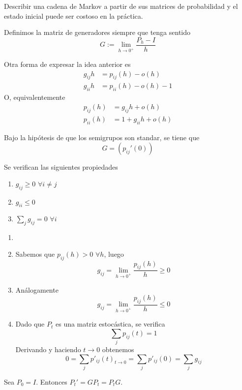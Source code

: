 \documentclass[PREyA.tex]{subfiles}
\begin{document}
\begin{nota}
Describir una cadena de Markov a partir de sus matrices de probabilidad y el estado inicial puede ser costoso en la práctica.
\end{nota}
\begin{defi}
Definimos la matriz de generadores siempre que tenga sentido
$$
G:= \lim_{h\to 0^+} \frac{P_h -I }{h} 
$$
\end{defi}
\begin{nota}
Otra forma de expresar la idea anterior es
\begin{align*}
g_{ij}h &= p_{ij}(h) - o(h)\\
g_{ii}h &= p_{ii}(h) - o(h) -1
\end{align*}
O, equivalentemente
\begin{align*}
p_{ij}(h) &= g_{ij}h + o(h)\\
p_{ii}(h) &= 1+ g_{ii}h + o(h) 
\end{align*}
\end{nota}
\begin{prop}
Bajo la hipótesis de que los semigrupos son standar, se tiene que
$$
G= (p_{ij}'(0))
$$
\end{prop}
\begin{prop}
Se verifican las siguientes propiedades
\begin{enumerate}
\item $g_{ij}\geq 0$ $\forall i \neq j$
\item $g_{ii} \leq 0$ 
\item $\sum_{j} g_{ij} = 0$ $\forall i$
\end{enumerate}
\end{prop}
\begin{dem}
\begin{enumerate}
\item[]
\item Sabemos que $p_{ij}(h)>0$ $\forall h$, luego
$$
g_{ij}=\lim_{h\to0^+}\frac{p_{ij}(h)}{h}\geq 0
$$
\item Análogamente
$$
g_{ij}=\lim_{h\to0^+}\frac{p_{ij}(h)}{h}\leq 0
$$
\item Dado que $P_t$ es una matriz estocástica, se verifica
$$
\sum_{j}p_{ij}(t)=1
$$
Derivando y haciendo $t\to 0$ obtenemos
$$
0 = \sum_j p'_{ij}(t)_{t\to 0} = \sum_j p'_{ij}(0) = \sum_j g_{ij}
$$
\end{enumerate}
\end{dem}
\begin{prop}
Sea $P_0 =I$. Entonces $P_t' = GP_t = P_tG$.
\end{prop}
\end{document}
